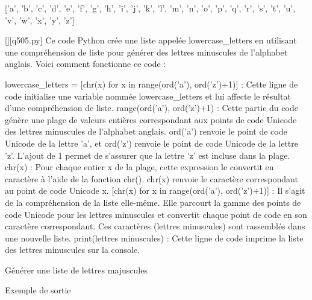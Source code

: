 ['a', 'b', 'c', 'd', 'e', 'f', 'g', 'h', 'i', 'j', 'k', 'l', 'm', 'n', 'o', 'p', 'q', 'r', 's', 't', 'u', 'v', 'w', 'x', 'y', 'z']
        \par
        \begin{solution}
            \renewcommand{\nomfichier}{q505.py}
            \pythonfile{\chemincode \nomfichier}[][\nomfichier]
            Ce code Python crée une liste appelée lowercase_letters en utilisant une compréhension de liste pour générer des lettres minuscules de l'alphabet anglais. Voici comment fonctionne ce code :

    lowercase_letters = [chr(x) for x in range(ord('a'), ord('z')+1)] : Cette ligne de code initialise une variable nommée lowercase_letters et lui affecte le résultat d'une compréhension de liste.
        range(ord('a'), ord('z')+1) : Cette partie du code génère une plage de valeurs entières correspondant aux points de code Unicode des lettres minuscules de l'alphabet anglais. ord('a') renvoie le point de code Unicode de la lettre 'a', et ord('z') renvoie le point de code Unicode de la lettre 'z'. L'ajout de 1 permet de s'assurer que la lettre 'z' est incluse dans la plage.
        chr(x) : Pour chaque entier x de la plage, cette expression le convertit en caractère à l'aide de la fonction chr(). chr(x) renvoie le caractère correspondant au point de code Unicode x.
        [chr(x) for x in range(ord('a'), ord('z')+1)] : Il s'agit de la compréhension de la liste elle-même. Elle parcourt la gamme des points de code Unicode pour les lettres minuscules et convertit chaque point de code en son caractère correspondant. Ces caractères (lettres minuscules) sont rassemblés dans une nouvelle liste.
    print(lettres minuscules) : Cette ligne de code imprime la liste des lettres minuscules sur la console.
        \end{solution}
        

        \question
        Générer une liste de lettres majuscules

Exemple de sortie

